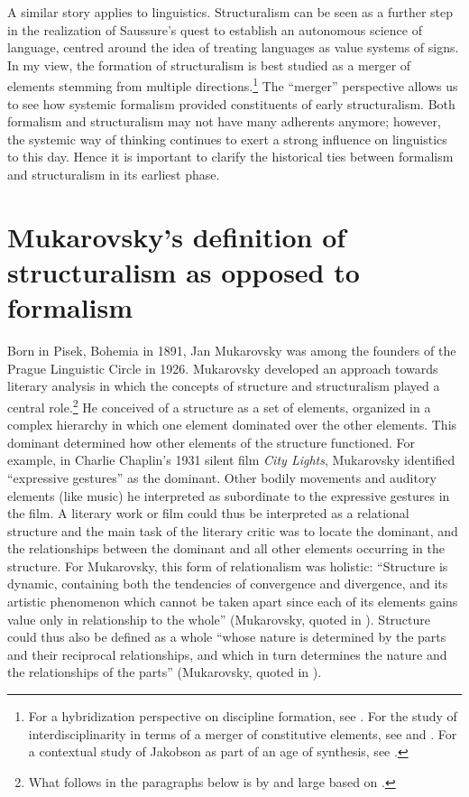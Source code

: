 \documentclass[output=paper]{langscibook}
\begin{document}
A similar story applies to linguistics.  Structuralism can be seen as a further step in the realization of Saussure's quest to establish an autonomous science of language, centred around the idea of treating languages as value systems of signs. In my view, the formation of structuralism is best studied as a merger of elements stemming from multiple directions.\footnote{For a hybridization perspective on discipline formation, see \citet{Karstens2012}. For the study of interdisciplinarity in terms of a merger of constitutive elements, see \citet{Graff2015} and \citet{Bod2019}. For a contextual study of Jakobson as part of an age of synthesis, see \citet{Karstens2017lonely}.} The ``merger'' perspective allows us to see how systemic formalism provided constituents of early structuralism. Both formalism and structuralism may not have many adherents anymore; however, the systemic way of thinking continues to exert a strong influence on linguistics to this day. Hence it is important to clarify the historical ties between formalism and structuralism in its earliest phase.

\section{Mukarovsky's definition of structuralism as opposed to formalism}
\label{sec:karstens:mukarovsky}

Born in Pisek, Bohemia in 1891, Jan Mukarovsky was among the founders of the Prague Linguistic Circle in 1926. Mukarovsky developed an approach towards literary analysis in which the concepts of structure and structuralism played a central role.\footnote{What follows in the paragraphs below is by and large based on \citep[22--44]{Galan1985}.} He conceived of a structure as a set of elements, organized in a complex hierarchy in which one element dominated over the other elements. This dominant determined how other elements of the structure functioned. For example, in Charlie Chaplin's 1931 silent film \emph{City Lights}, Mukarovsky identified ``expressive gestures'' as the dominant. Other bodily movements and auditory elements (like music) he interpreted as subordinate to the expressive gestures in the film. A literary work or film could thus be interpreted as a relational structure and the main task of the literary critic was to locate the dominant, and the relationships between the dominant and all other elements occurring in the structure. For Mukarovsky, this form of relationalism was holistic: ``Structure is dynamic, containing both the tendencies of convergence and divergence, and its artistic phenomenon which cannot be taken apart since each of its elements gains value only in relationship to the whole'' (Mukarovsky, quoted in \citealt[30]{Galan1985}). Structure could thus also be defined as a whole ``whose nature is determined by the parts and their reciprocal relationships, and which in turn determines the nature and the relationships of the parts'' (Mukarovsky, quoted in \citealt[35]{Galan1985}).
\end{document}

